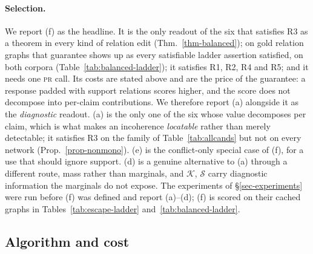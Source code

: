 \paragraph{Selection.} We report (f) as the headline. It is the only readout of the six that
satisfies R3 as a theorem in every kind of relation edit (Thm.~\ref{thm-balanced}); on gold relation
graphs that guarantee shows up as every satisfiable ladder assertion satisfied, on both corpora
(Table~\ref{tab:balanced-ladder}); it satisfies R1, R2, R4 and R5; and it needs one \textsc{pr}
call. Its costs are stated above and are the price of the guarantee: a response padded with support
relations scores higher, and the score does not decompose into per-claim contributions. We
therefore report (a) alongside it as the \emph{diagnostic} readout. (a) is the only one of the six
whose value decomposes per claim, which is what makes an incoherence \emph{locatable} rather than
merely detectable; it satisfies R3 on the family of Table~\ref{tab:allcands} but not on every
network (Prop.~\ref{prop-nonmono}). (e) is the conflict-only special case of (f), for a use that
should ignore support. (d) is a genuine alternative to (a) through a different route, mass rather
than marginals, and $\mathcal{K}$, $\mathcal{S}$ carry diagnostic information the marginals do not
expose. The experiments of \S\ref{sec-experiments} were run before (f) was defined and report
(a)--(d); (f) is scored on their cached graphs in Tables~\ref{tab:escape-ladder}
and~\ref{tab:balanced-ladder}.

\subsection{Algorithm and cost}
\label{sec-algo}

